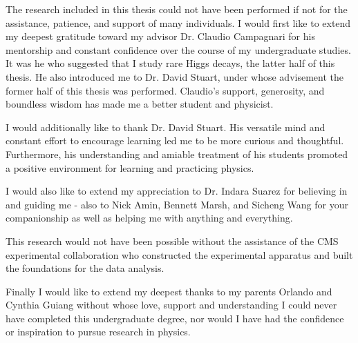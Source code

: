 \begin{acknowledgements}

The research included in this thesis could not have been performed if not for the assistance, patience, and support of many individuals.  I would first like to extend my deepest gratitude toward my advisor Dr. Claudio Campagnari for his mentorship and constant confidence over the course of my undergraduate studies. It was he who suggested that I study rare Higgs decays, the latter half of this thesis. He also introduced me to Dr. David Stuart, under whose advisement the former half of this thesis was performed. Claudio's support, generosity, and boundless wisdom has made me a better student and physicist.

I would additionally like to thank Dr. David Stuart. His versatile mind and constant effort to encourage learning led me to be more curious and thoughtful. Furthermore, his understanding and amiable treatment of his students promoted a positive environment for learning and practicing physics.

I would also like to extend my appreciation to Dr. Indara Suarez for believing in and guiding me - also to Nick Amin, Bennett Marsh, and Sicheng Wang for your companionship as well as helping me with anything and everything.

This research would not have been possible without the assistance of the CMS experimental collaboration who constructed the experimental apparatus and built the foundations for the data analysis.  

Finally I would like to extend my deepest thanks to my parents Orlando and Cynthia Guiang without whose love, support and understanding I could never have completed this undergraduate degree, nor would I have had the confidence or inspiration to pursue research in physics.

\end{acknowledgements} 